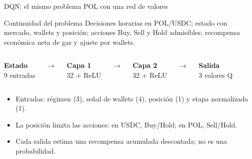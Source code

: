 



\begin{frame}{DQN: el mismo problema POL con una red de valores}
\begin{block}{Continuidad del problema}
\small Decisiones horarias en POL/USDC; estado con mercado, wallets y posición; acciones Buy, Sell y Hold admisibles; recompensa económica neta de gas y ajuste por wallets.
\end{block}
\vspace{.6em}
\begin{columns}[c,onlytextwidth]
\centering\colorbox{lightpanel}{\parbox[c][1.4cm][c]{.92\linewidth}{\centering\textbf{Estado}\\[.3em]9 entradas}}
\centering$\rightarrow$
\centering\colorbox{lightpanel}{\parbox[c][1.4cm][c]{.92\linewidth}{\centering\textbf{Capa 1}\\[.3em]32 + ReLU}}
\centering$\rightarrow$
\centering\colorbox{lightpanel}{\parbox[c][1.4cm][c]{.92\linewidth}{\centering\textbf{Capa 2}\\[.3em]32 + ReLU}}
\centering$\rightarrow$
\centering\colorbox{lightpanel}{\parbox[c][1.4cm][c]{.92\linewidth}{\centering\textbf{Salida}\\[.3em]3 valores Q}}
\end{columns}
\vspace{.7em}
\small
\begin{itemize}
\item Entradas: régimen (3), señal de wallets (4), posición (1) y etapa normalizada (1).
\item La posición limita las acciones: en USDC, Buy/Hold; en POL, Sell/Hold.
\item Cada salida estima una recompensa acumulada descontada; no es una probabilidad.
\end{itemize}
\end{frame}

